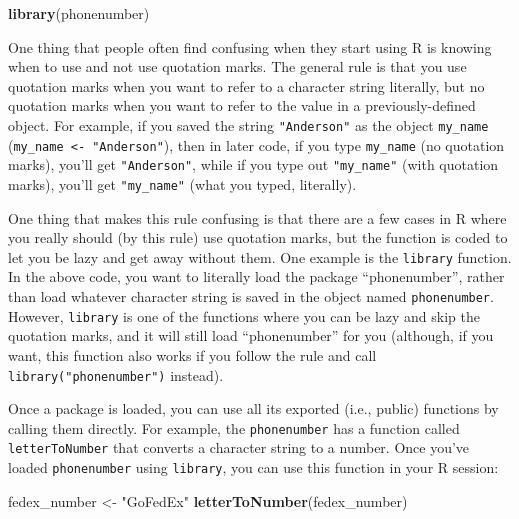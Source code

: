 \documentclass[]{book}
\makeatletter
\newenvironment{Shaded}{\begin{snugshade}}{\end{snugshade}}
\newcommand{\KeywordTok}[1]{\textcolor[rgb]{0.13,0.29,0.53}{\textbf{#1}}}
\newcommand{\StringTok}[1]{\textcolor[rgb]{0.31,0.60,0.02}{#1}}
\newcommand{\NormalTok}[1]{#1}
\newenvironment{kframe}{%
\medskip{}
\setlength{\fboxsep}{.8em}
 \def\at@end@of@kframe{}%
 \ifinner\ifhmode%
  \def\at@end@of@kframe{\end{minipage}}%
  \begin{minipage}{\columnwidth}%
 \fi\fi%
 \def\FrameCommand##1{\hskip\@totalleftmargin \hskip-\fboxsep
 \colorbox{shadecolor}{##1}\hskip-\fboxsep
     \hskip-\linewidth \hskip-\@totalleftmargin \hskip\columnwidth}%
 \MakeFramed {\advance\hsize-\width
   \@totalleftmargin\z@ \linewidth\hsize
   \@setminipage}}%
 {\par\unskip\endMakeFramed%
 \at@end@of@kframe}
\renewenvironment{Shaded}{\begin{kframe}}{\end{kframe}}
\newenvironment{rmdblock}[1]
  {
  \begin{itemize}
  \renewcommand{\labelitemi}{
    \raisebox{-.7\height}[0pt][0pt]{
      {\setkeys{Gin}{width=3em,keepaspectratio}\texttt{[image: images/\#1]}}
    }
  }
  \setlength{\fboxsep}{1em}
  \begin{kframe}
  \item
  }
  {
  \end{kframe}
  \end{itemize}
  }
\newenvironment{rmdtip}
  {\begin{rmdblock}{tip}}
  {\end{rmdblock}}
\theoremstyle{definition}
\theoremstyle{definition}
\theoremstyle{definition}
\theoremstyle{remark}
\makeatother
\begin{document}
\begin{Shaded}
\begin{Highlighting}[]
\KeywordTok{library}\NormalTok{(phonenumber)}
\end{Highlighting}
\end{Shaded}

\begin{rmdtip}
One thing that people often find confusing when they start using R is
knowing when to use and not use quotation marks. The general rule is
that you use quotation marks when you want to refer to a character
string literally, but no quotation marks when you want to refer to the
value in a previously-defined object. For example, if you saved the
string \texttt{"Anderson"} as the object \texttt{my\_name}
(\texttt{my\_name\ \textless{}-\ "Anderson"}), then in later code, if
you type \texttt{my\_name} (no quotation marks), you'll get
\texttt{"Anderson"}, while if you type out \texttt{"my\_name"} (with
quotation marks), you'll get \texttt{"my\_name"} (what you typed,
literally).

One thing that makes this rule confusing is that there are a few cases
in R where you really should (by this rule) use quotation marks, but the
function is coded to let you be lazy and get away without them. One
example is the \texttt{library} function. In the above code, you want to
literally load the package ``phonenumber'', rather than load whatever
character string is saved in the object named \texttt{phonenumber}.
However, \texttt{library} is one of the functions where you can be lazy
and skip the quotation marks, and it will still load ``phonenumber'' for
you (although, if you want, this function also works if you follow the
rule and call \texttt{library("phonenumber")} instead).
\end{rmdtip}

Once a package is loaded, you can use all its exported (i.e., public)
functions by calling them directly. For example, the
\texttt{phonenumber} has a function called \texttt{letterToNumber} that
converts a character string to a number. Once you've loaded
\texttt{phonenumber} using \texttt{library}, you can use this function
in your R session:

\begin{Shaded}
\begin{Highlighting}[]
\NormalTok{fedex_number <-}\StringTok{ "GoFedEx"}
\KeywordTok{letterToNumber}\NormalTok{(fedex_number)}
\end{Highlighting}
\end{Shaded}
\end{document}
